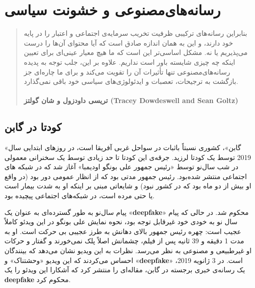 
\chapter{رسانه‌های‌مصنوعی و خشونت سیاسی}
\label{ch:رسانه‌های‌مصنوعی و خشونت سیاسی}

\begin{quote}
    بنابراین رسانه‌های ترکیبی ظرفیت تخریب سرمایه‌ی اجتماعی و اعتبار را در پایه خود دارند، و این به همان اندازه صادق است که آیا محتوای آن‌ها را درست می‌پذیریم یا نه.
    مشکل اساسی‌تر این است که ما هیچ معیار عینی‌ای برای تعیین اینکه چه چیزی شایسته باور است نداریم.
    علاوه بر این، جلب توجه به پدیده رسانه‌های‌مصنوعی تنها تأثیرات آن را تقویت می‌کند و برای ما چاره‌ای جز بازگشت به ترجیحات، تعصبات و ایدئولوژی‌های سیاسی خود باقی نمی‌گذارد.
    \\\\
    \textbf{تریسی داودزول و شان گولتز \textenglish{\textbf{(Tracey Dowdeswell and Sean Goltz)}}}
    \newline
\end{quote}


{
\section*{کودتا در گابن}
\label{sec:کودتا در گابن}
«گابن»، کشوری نسبتاً باثبات در سواحل غربی آفریقا است، در روزهای ابتدایی سال 2019 توسط یک کودتا لرزید. جرقه‌ی این کودتا تا حد زیادی توسط یک سخنرانی معمولی در شب سال‌نو توسط «رئیس جمهور علی بونگو اودیمبا» آغاز شد که در شبکه های اجتماعی منتشر شده‌بود. رئیس جمهور مدتی بود که از انظار عمومی دور بود (در واقع او بیش از دو ماه بود که در کشور نبود) و شایعاتی مبنی بر اینکه او به شدت بیمار است یا حتی مرده است، در شبکه‌های اجتماعی پیچیده بود.
}



پیام سال‌نو به طور گسترده‌ای به عنوان یک «\textenglish{\textbf{deepfake}}» محکوم شد.
در حالی که پیام سال نو به خودی خود غیرقابل توجه بود، نحوه نمایش علی بونگو در این ویدئو کاملاً عجیب است: چهره رئیس جمهور بالای دهانش به طرز عجیبی بی حرکت است.
او به مدت 1 دقیقه و 39 ثانیه پس از فیلم، چشمانش اصلاً پلک نمی‌خورند و گفتار و حرکات او غیرطبیعی و مصنوعی به نظر می‌رسد.
نظرات به این ویدیو نشان می‌دهد که بینندگان احساس می‌کردند که این ویدیو «وحشتناک» و «\textenglish{\textbf{deepfake}}» است.
در 3 ژانویه 2019، یک رسانه‌ی خبری برجسته در گابن، مقاله‌ای را منتشر کرد که آشکارا این ویدئو را یک \textenglish{\textbf{deepfake}} محکوم کرد.

